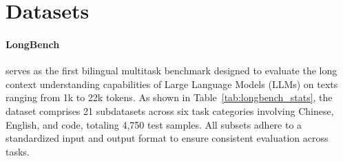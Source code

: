 \documentclass[11pt]{article}
\begin{document}
\begin{table}[t]
    \centering
    \caption{Statistics of L-Eval Task Categories. The suite comprises 20 datasets categorized by task type. "En" denotes English language tasks.}
    \label{tab:leval_stats}
\end{table}

\section{Datasets}
\label{appendix:datasets}

\paragraph{LongBench} \cite{bai2024longbench} serves as the first bilingual multitask benchmark designed to evaluate the long context understanding capabilities of Large Language Models (LLMs) on texts ranging from 1k to 22k tokens. As shown in Table~\ref{tab:longbench_stats}, the dataset comprises 21 subdatasets across six task categories involving Chinese, English, and code, totaling 4,750 test samples. All subsets adhere to a standardized input and output format to ensure consistent evaluation across tasks.
\end{document}
